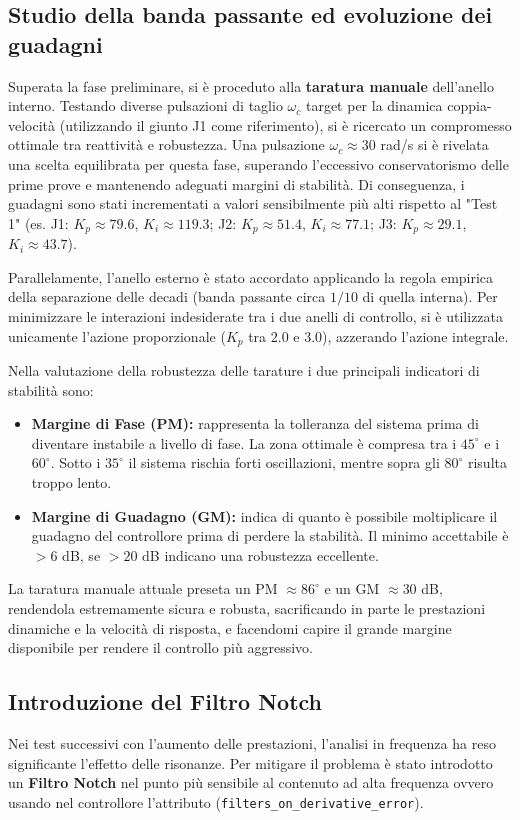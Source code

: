 \documentclass{article}
\begin{document}
\subsection*{Studio della banda passante ed evoluzione dei guadagni}
Superata la fase preliminare, si è proceduto alla \textbf{taratura manuale} dell'anello interno. 
Testando diverse pulsazioni di taglio $\omega_c$ target per la dinamica coppia-velocità 
(utilizzando il giunto J1 come riferimento), si è ricercato un compromesso ottimale tra reattività e robustezza. 
Una pulsazione $\omega_c \approx 30$ rad/s si è rivelata una scelta equilibrata per questa fase, 
superando l'eccessivo conservatorismo delle prime prove e mantenendo adeguati margini di stabilità. 
Di conseguenza, i guadagni sono stati incrementati a valori sensibilmente più alti rispetto al "Test 1" 
(es. J1: $K_p \approx 79.6$, $K_i \approx 119.3$; J2: $K_p \approx 51.4$, $K_i \approx 77.1$; J3: $K_p \approx 29.1$, $K_i \approx 43.7$).

Parallelamente, l'anello esterno è stato accordato applicando la regola empirica della 
separazione delle decadi (banda passante circa $1/10$ di quella interna). Per minimizzare le interazioni 
indesiderate tra i due anelli di controllo, si è utilizzata unicamente l'azione proporzionale ($K_p$ tra $2.0$ e $3.0$), 
azzerando l'azione integrale.

Nella valutazione della robustezza delle tarature i due principali indicatori di stabilità sono:
\begin{itemize}
    \item \textbf{Margine di Fase (PM):} rappresenta la tolleranza del sistema prima di diventare instabile
     a livello di fase. La zona ottimale è compresa tra i $45^\circ$ e i $60^\circ$. 
     Sotto i $35^\circ$ il sistema rischia forti oscillazioni, mentre sopra gli $80^\circ$ risulta troppo lento. 
    \item \textbf{Margine di Guadagno (GM):} indica di quanto è possibile moltiplicare 
    il guadagno del controllore prima di perdere la stabilità. Il minimo accettabile è $> 6$ dB, 
    se $> 20$ dB indicano una robustezza eccellente. 
\end{itemize}
La taratura manuale attuale preseta un PM $\approx 86^\circ$ e un GM $\approx 30$ dB, rendendola estremamente sicura e robusta, sacrificando in 
parte le prestazioni dinamiche e la velocità di risposta, e facendomi capire il grande margine disponibile per rendere il controllo più aggressivo.

\subsection*{Introduzione del Filtro Notch}
Nei test successivi con l'aumento delle prestazioni, l'analisi in frequenza ha reso 
significante l'effetto delle risonanze. Per mitigare il problema è stato introdotto un 
\textbf{Filtro Notch} nel punto più sensibile al contenuto ad alta frequenza ovvero usando 
nel controllore l'attributo (\texttt{filters\_on\_derivative\_error}).
\end{document}
